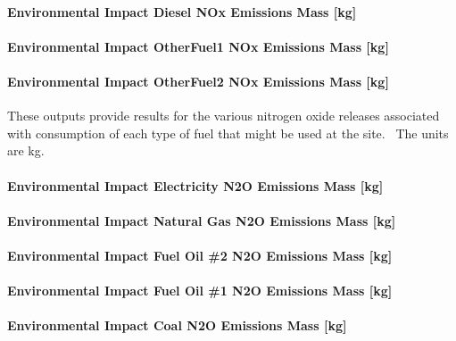 \paragraph{Environmental Impact Diesel NOx Emissions Mass {[}kg{]}}\label{environmental-impact-diesel-nox-emissions-mass-kg}

\paragraph{Environmental Impact OtherFuel1 NOx Emissions Mass {[}kg{]}}\label{environmental-impact-otherfuel1-nox-emissions-mass-kg}

\paragraph{Environmental Impact OtherFuel2 NOx Emissions Mass {[}kg{]}}\label{environmental-impact-otherfuel2-nox-emissions-mass-kg}

These outputs provide results for the various nitrogen oxide releases associated with consumption of each type of fuel that might be used at the site.~ The units are kg.

\paragraph{Environmental Impact Electricity N2O Emissions Mass {[}kg{]}}\label{environmental-impact-electricity-n2o-emissions-mass-kg}

\paragraph{Environmental Impact Natural Gas N2O Emissions Mass {[}kg{]}}\label{environmental-impact-natural-gas-n2o-emissions-mass-kg}

\paragraph{Environmental Impact Fuel Oil \#2 N2O Emissions Mass {[}kg{]}}\label{environmental-impact-fuel-oil-2-n2o-emissions-mass-kg}

\paragraph{Environmental Impact Fuel Oil \#1 N2O Emissions Mass {[}kg{]}}\label{environmental-impact-fuel-oil-1-n2o-emissions-mass-kg}

\paragraph{Environmental Impact Coal N2O Emissions Mass {[}kg{]}}\label{environmental-impact-coal-n2o-emissions-mass-kg}

